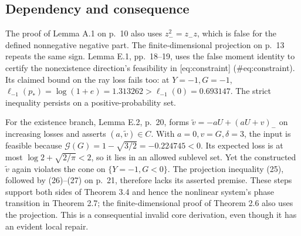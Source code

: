 \documentclass[10pt]{article}
\begin{document}
\subsection*{Dependency and consequence}
The proof of Lemma A.1 on p. 10 also uses \(z_-^2=z_-z\), which is false for the defined nonnegative negative part. The finite-dimensional projection on p. 13 repeats the same sign. Lemma E.1, pp. 18–19, uses the false moment identity to certify the nonexistence direction’s feasibility in [eq:constraint] (\#eq:constraint). Its claimed bound on the ray loss fails too: at \(Y=-1,G=-1\), \(\ell_{-1}(p_*)=\log(1+e)=1.313262>\ell_{-1}(0)=0.693147\). The strict inequality persists on a positive-probability set.\par
For the existence branch, Lemma E.2, p. 20, forms \(\widetilde v=-aU+(aU+v)_-\) on increasing losses and asserts \((a,\widetilde v)\in C\). With \(a=0,v=G,\delta=3\), the input is feasible because \(\mathcal G(G)=1-\sqrt{3/2}=-0.224745<0\). Its expected loss is at most \(\log2+\sqrt{2/\pi}<2\), so it lies in an allowed sublevel set. Yet the constructed \(\widetilde v\) again violates the cone on \(\{Y=-1,G<0\}\). The projection inequality (25), followed by (26)–(27) on p. 21, therefore lacks its asserted premise. These steps support both sides of Theorem 3.4 and hence the nonlinear system’s phase transition in Theorem 2.7; the finite-dimensional proof of Theorem 2.6 also uses the projection. This is a consequential invalid core derivation, even though it has an evident local repair.\par
\end{document}
